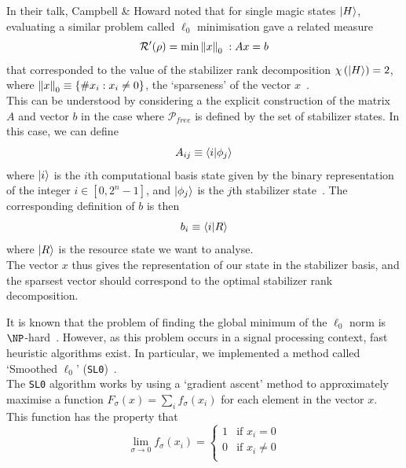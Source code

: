 \documentclass{standalone}
\begin{document}
In their talk, Campbell \& Howard noted that for single magic states $\ket{H}$, evaluating a similar problem called $\ell_{0}$ minimisation gave a related measure 
\begin{equation}
    \mathcal{R}'(\rho)=\min \norm{x}_{0}\; : Ax=b
\end{equation}
that corresponded to the value of the stabilizer rank decomposition $\chi\left(\ket{H}\right)=2$, where $\norm{x}_{0}\equiv \{\# x_{i} : x_{i}\neq 0\}$, the `sparseness' of the vector $x$~\cite{Howard2016}.\\
This can be understood by considering a the explicit construction of the matrix $A$ and vector $b$ in the case where $\mathcal{P}_{free}$ is defined by the set of stabilizer states. In this case, we can define 
\begin{equation}\label{eq:Amat}
    A_{ij}\equiv\braket{i}{\phi_{j}}
\end{equation}
where $\ket{i}$ is the $i$th computational basis state given by the binary representation of the integer $i\in[0,2^{n}-1]$, and $\ket{\phi_{j}}$ is the $j$th stabilizer state~\cite{Howard2016}. The corresponding definition of $b$ is then
\begin{equation}\label{eq:bvec}
    b_{i}\equiv \braket{i}{R}
\end{equation}
where $\ket{R}$ is the resource state we want to analyse.\\
The vector $x$ thus gives the representation of our state in the stabilizer basis, and the sparsest vector should correspond to the optimal stabilizer rank decomposition. 
\par
It is known that the problem of finding the global minimum of the $\ell_{0}$ norm is $\NP$-hard~\cite{ge2011note}. However, as this problem occurs in a signal processing context, fast heuristic algorithms exist. In particular, we implemented a method called `Smoothed $\ell_{0}$' (\texttt{SL0})~\cite{Mohimani2009}. \\
The \texttt{SL0} algorithm works by using a `gradient ascent' method to approximately maximise a function $F_{\sigma}(x)=\sum_{i}f_{\sigma}(x_{i})$ for each element in the vector $x$. This function has the property that
\begin{equation}\label{eq:limf}
    \lim_{\sigma\rightarrow 0}f_{\sigma}(x_{i}) = \begin{cases} 1 & \text{if } x_{i}=0\\
                                                                0 & \text{if } x_{i}\neq 0\\
                                                  \end{cases}
\end{equation}
\end{document}
